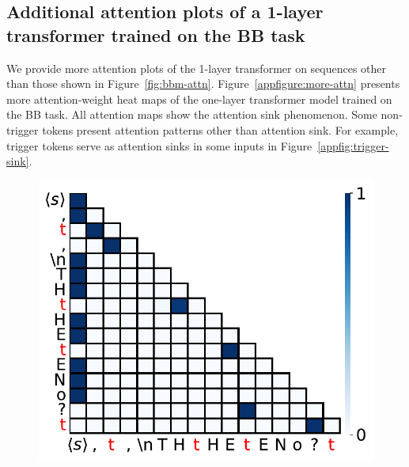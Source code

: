 \subsection{Additional attention plots of a 1-layer transformer trained on the BB task}
\label{appsec:additional-attn-maps}
We provide more attention plots of the 1-layer transformer on sequences other than those shown in Figure~\ref{fig:bbm-attn}.
Figure~\ref{appfigure:more-attn} presents more attention-weight heat maps of the one-layer transformer model trained on the BB task. All attention maps show the attention sink phenomenon. Some non-trigger tokens present attention patterns other than attention sink. For example, trigger tokens serve as attention sinks in some inputs in Figure~\ref{appfig:trigger-sink}.
\begin{figure}[h]
  \centering
  \begin{minipage}{0.3\textwidth}
      \centering
      \vspace{-.2em}
      \includegraphics[width=\linewidth]{Figures/BBM_appendix/app_attn_fig1.pdf}
  \end{minipage}
  \begin{minipage}{0.3\textwidth}
      \centering
      \vspace{-.2em}

\end{minipage}
\end{figure}
